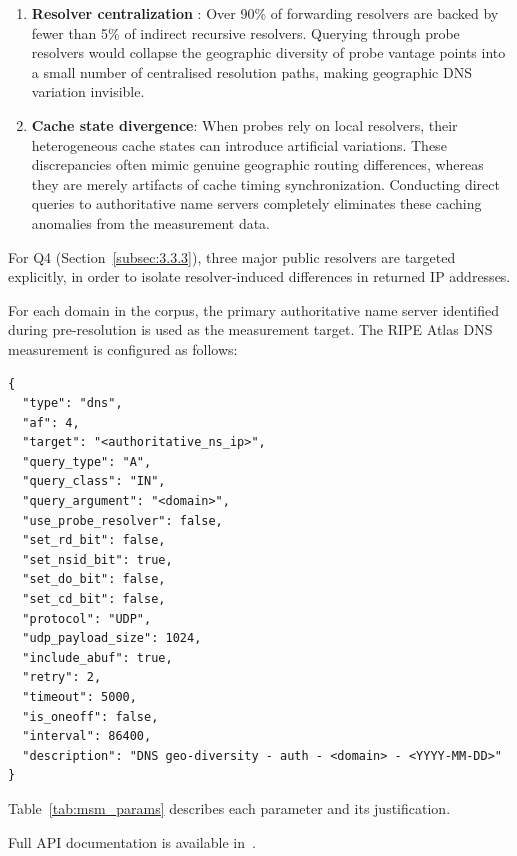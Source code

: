\begin{enumerate}
  \item \textbf{Resolver centralization} \cite{Xu2023}: Over 90\% of forwarding resolvers are backed by fewer than 5\% of indirect recursive resolvers. Querying through probe resolvers would collapse the geographic diversity of probe vantage points into a small number of centralised resolution paths, making geographic \ac{DNS} variation invisible.
  \item \textbf{Cache state divergence}: When probes rely on local resolvers, their heterogeneous cache states can introduce artificial variations. These discrepancies often mimic genuine geographic routing differences, whereas they are merely artifacts of cache timing synchronization. Conducting direct queries to authoritative name servers completely eliminates these caching anomalies from the measurement data.
\end{enumerate}

For Q4 (Section~\ref{subsec:3.3.3}), three major public resolvers are targeted explicitly, in order to isolate resolver-induced differences in returned \ac{IP} addresses.

For each domain in the corpus, the primary authoritative name server identified during pre-resolution is used as the measurement target. The RIPE Atlas \ac{DNS} measurement is configured as follows:

\begin{lstlisting}[style=json]
{
  "type": "dns",
  "af": 4,
  "target": "<authoritative_ns_ip>",
  "query_type": "A",
  "query_class": "IN",
  "query_argument": "<domain>",
  "use_probe_resolver": false,
  "set_rd_bit": false,
  "set_nsid_bit": true,
  "set_do_bit": false,
  "set_cd_bit": false,
  "protocol": "UDP",
  "udp_payload_size": 1024,
  "include_abuf": true,
  "retry": 2,
  "timeout": 5000,
  "is_oneoff": false,
  "interval": 86400,
  "description": "DNS geo-diversity - auth - <domain> - <YYYY-MM-DD>"
}

\end{lstlisting}

Table~\ref{tab:msm_params} describes each parameter and its justification.

Full API documentation is available in~\cite{RIPEAtlasDocs2026}.

